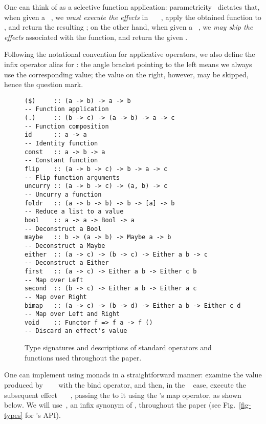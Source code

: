 \noindent
One can think of  as a selective function application:
parametricity~\citep{wadler1989theorems} dictates that, when given a
~, we \emph{must execute the effects} in
~\hs{(}~\hs{->}~, apply the obtained function to , and
return the resulting ; on the other hand, when given a ~,
we \emph{may skip the effects} associated with the function, and return the
given .

Following the notational convention for applicative operators, we also define
the infix operator alias  for : the angle bracket pointing to
the left means we always use the corresponding value; the value on the right,
however, may be skipped, hence the question mark.

\begin{figure}
\begin{verbatim}
($)     :: (a -> b) -> a -> b                               -- Function application
(.)     :: (b -> c) -> (a -> b) -> a -> c                   -- Function composition
id      :: a -> a                                           -- Identity function
const   :: a -> b -> a                                      -- Constant function
flip    :: (a -> b -> c) -> b -> a -> c                     -- Flip function arguments
uncurry :: (a -> b -> c) -> (a, b) -> c                     -- Uncurry a function
foldr   :: (a -> b -> b) -> b -> [a] -> b                   -- Reduce a list to a value
bool    :: a -> a -> Bool -> a                              -- Deconstruct a Bool
maybe   :: b -> (a -> b) -> Maybe a -> b                    -- Deconstruct a Maybe
either  :: (a -> c) -> (b -> c) -> Either a b -> c          -- Deconstruct a Either
first   :: (a -> c) -> Either a b -> Either c b             -- Map over Left
second  :: (b -> c) -> Either a b -> Either a c             -- Map over Right
bimap   :: (a -> c) -> (b -> d) -> Either a b -> Either c d -- Map over Left and Right
void    :: Functor f => f a -> f ()                         -- Discard an effect's value
\end{verbatim}
\caption{Type signatures and descriptions of standard operators and functions
used throughout the paper.}\label{fig-std}
\end{figure}

One can implement  using monads in a straightforward manner: examine
the value produced by ~~~ with the bind operator,
and then, in the ~ case, execute the subsequent effect
~~\hs{->}~, passing the  to it using the
's map operator, as shown below. We will use~, an
infix synonym of , throughout the paper (see Fig.~\ref{fig-types} for
's API).

